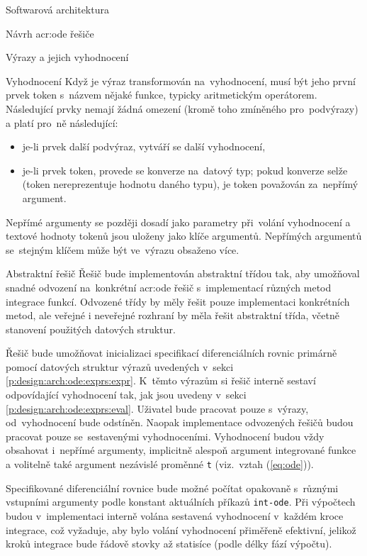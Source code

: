 \documentclass[thesis=M,czech]{FITthesis}[2012/06/26]
\newcommand{\acrlabel}[1]{acr:#1}
\newcommand{\acr}[1]{\acrshort{\acrlabel{#1}}}
\newcommand{\id}[1]{\texttt{#1}}
\newcommand{\rf}[1]{\ref{#1}}
\newcommand{\rfeq}[1]{(\rf{eq:#1})}
\begin{document}
\begin{section}{Softwarová architektura}
\begin{subsection}{Návrh \acr{ode} řešiče}
\begin{subsubsection}{Výrazy a jejich vyhodnocení}
\begin{paragraph}{Vyhodnocení}
Když je výraz transformován na~vyhodnocení,
musí být jeho první prvek token s~názvem nějaké funkce,
typicky aritmetickým operátorem.
Následující prvky nemají žádná omezení
(kromě toho zmíněného pro~podvýrazy)
a platí pro~ně následující:
\begin{itemize}
\item je-li prvek další podvýraz, vytváří se další vyhodnocení,
\item je-li prvek token, provede se konverze na~datový typ;
   pokud konverze selže (token nereprezentuje hodnotu daného typu),
   je token považován za~nepřímý argument.
\end{itemize}
Nepřímé argumenty se později dosadí
jako parametry při~volání vyhodnocení
a textové hodnoty tokenů jsou uloženy jako klíče argumentů.
Nepřímých argumentů se~stejným klíčem
může být ve~výrazu obsaženo více.
\end{paragraph} %


\end{subsubsection} %


\begin{subsubsection}{Abstraktní řešič}\label{sss:design:arch:ode:solver}
Řešič bude implementován abstraktní třídou tak,
aby umožňoval snadné odvození na~konkrétní \acr{ode} řešič
s~implementací různých metod integrace funkcí.
Odvozené třídy by měly řešit pouze implementaci konkrétních metod,
ale veřejné i neveřejné rozhraní by měla řešit abstraktní třída,
včetně stanovení použitých datových struktur.

Řešič bude umožňovat inicializaci
specifikací diferenciálních rovnic
primárně pomocí datových struktur výrazů uvedených
v~sekci \rf{p:design:arch:ode:exprs:expr}.
K~těmto výrazům si řešič interně sestaví odpovídající
vyhodnocení tak, jak jsou uvedeny
v~sekci \rf{p:design:arch:ode:exprs:eval}.
Uživatel bude pracovat pouze s~výrazy,
od~vyhodnocení bude odstíněn.
Naopak implementace odvozených řešičů
budou pracovat pouze se~sestavenými vyhodnoceními.
Vyhodnocení budou vždy obsahovat i~nepřímé argumenty,
implicitně alespoň argument integrované funkce
a volitelně také argument nezávislé proměnné \id{t}
(viz.~vztah \rfeq{ode}).

Specifikované diferenciální rovnice bude možné počítat opakovaně
s~různými vstupními argumenty podle konstant
aktuálních příkazů \id{int\--ode}.
Při výpočtech budou v~implementaci
interně volána sestavená vyhodnocení
v~každém kroce integrace,
což vyžaduje, aby bylo volání vyhodnocení
přiměřeně efektivní,
jelikož kroků integrace
bude řádově stovky až statisíce
(podle délky fází výpočtu).


\end{subsubsection}
\end{subsection}
\end{section}
\end{document}
